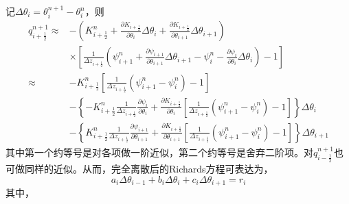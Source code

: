 记$\Delta \theta_i=\theta_i^{n+1}-\theta_i^n$，则
\begin{equation}
  \begin{split}
    q_{i+\frac{1}{2}}^{n+1} \approx &-\left(K_{i+\frac{1}{2}}^{n}+\frac{\partial K_{i+\frac{1}{2}}}{\partial \theta_{i}} \Delta \theta_{i} + \frac{\partial K_{i+\frac{1}{2}}}{\partial \theta_{i+1}} \Delta \theta_{i+1}\right)  \\
    & \times \left[\frac{1}{\Delta z_{i+\frac{1}{2}}}\left(\psi_{i+1}^{n}+\frac{\partial \psi_{i+1}}{\partial \theta_{i+1}} \Delta \theta_{i+1}-\psi_{i}^{n}-\frac{\partial \psi_{i}}
    {\partial \theta_{i}} \Delta \theta_{i}\right)-1\right] \\
    \approx & -K_{i+\frac{1}{2}}^{n}\left[\frac{1}{\Delta z_{i+\frac{1}{2}}}\left(\psi_{i+1}^{n}-\psi_{i}^{n}\right)-1\right] \\
    &-\left\{-K_{i+\frac{1}{2}}^{n} \frac{1}{\Delta z_{i+\frac{1}{2}}} \frac{\partial \psi_{i}}{\partial \theta_{i}}+\frac{\partial K_{i+\frac{1}{2}}}{\partial
    \theta_{i}}\left[\frac{1}{\Delta z_{i+\frac{1}{2}}}\left(\psi_{i+1}^{n}-\psi_{i}^{n}\right)-1\right]\right\} \Delta \theta_{i} \\
    &-\left\{K_{i+\frac{1}{2}}^{n} \frac{1}{\Delta z_{i+\frac{1}{2}}} \frac{\partial \psi_{i+1}}{\partial \theta_{i+1}}+\frac{\partial K_{i+\frac{1}{2}}}{\partial
    \theta_{i+1}}\left[\frac{1}{\Delta z_{i+\frac{1}{2}}}\left(\psi_{i+1}^{n}-\psi_{i}^{n}\right)-1\right]\right\} \Delta \theta_{i+1}
  \end{split}
\end{equation}
其中第一个约等号是对各项做一阶近似，第二个约等号是舍弃二阶项。对$q_{i-\frac{1}{2}}^{n+1}$也可做同样的近似。从而，完全离散后的Richards方程可表达为，
\begin{equation}
  a_i \Delta \theta_{i-1}+b_i \Delta \theta_{i}+c_i \Delta \theta_{i+1}=r_i
\end{equation}
其中，

